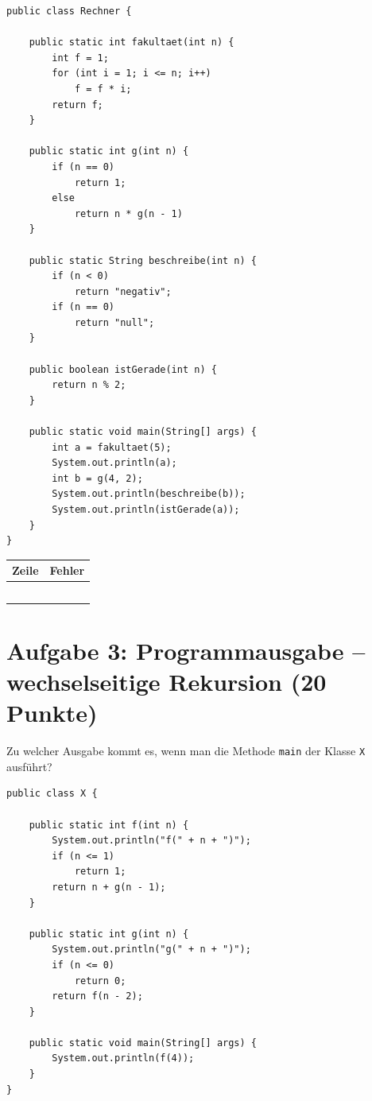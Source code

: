 \documentclass[
	fontsize=12pt,
	paper=a4,
	numbers=noenddot,
	parskip=half,
	openany
]{scrbook}
\begin{document}
\begin{lstlisting}
public class Rechner {

    public static int fakultaet(int n) {
        int f = 1;
        for (int i = 1; i <= n; i++)
            f = f * i;
        return f;
    }

    public static int g(int n) {
        if (n == 0)
            return 1;
        else
            return n * g(n - 1)
    }

    public static String beschreibe(int n) {
        if (n < 0)
            return "negativ";
        if (n == 0)
            return "null";
    }

    public boolean istGerade(int n) {
        return n % 2;
    }

    public static void main(String[] args) {
        int a = fakultaet(5);
        System.out.println(a);
        int b = g(4, 2);
        System.out.println(beschreibe(b));
        System.out.println(istGerade(a));
    }
}
\end{lstlisting}

\begin{center}
\begin{tabular}{|p{1.6cm}|p{10.5cm}|}
	\hline
	\textbf{Zeile} & \textbf{Fehler} \\ \hline
	& \\[2cm] \hline
	& \\[2cm] \hline
	& \\[2cm] \hline
	& \\[2cm] \hline
	& \\[2cm] \hline
\end{tabular}
\end{center}

\clearpage
\section*{Aufgabe 3: Programmausgabe -- wechselseitige Rekursion \hfill (20 Punkte)}

Zu welcher Ausgabe kommt es, wenn man die Methode \texttt{main} der Klasse \texttt{X} ausführt?

\begin{lstlisting}
public class X {

    public static int f(int n) {
        System.out.println("f(" + n + ")");
        if (n <= 1)
            return 1;
        return n + g(n - 1);
    }

    public static int g(int n) {
        System.out.println("g(" + n + ")");
        if (n <= 0)
            return 0;
        return f(n - 2);
    }

    public static void main(String[] args) {
        System.out.println(f(4));
    }
}
\end{lstlisting}
\end{document}
